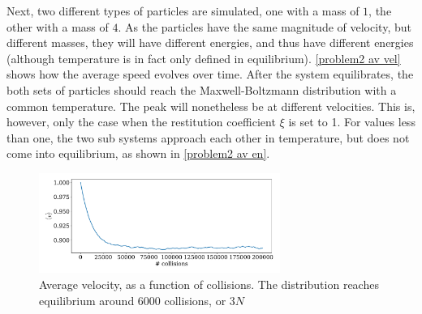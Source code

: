\documentclass{article}
\begin{document}
    Next, two different types of particles are simulated, one with a mass of $1$, the other with a mass of $4$.
    As the particles have the same magnitude of velocity, but different masses, they will have different energies, and thus have different energies (although temperature is in fact only defined in equilibrium).
    \autoref{problem2 av vel} shows how the average speed evolves over time.
    After the system equilibrates, the both sets of particles should reach the Maxwell-Boltzmann distribution with a common temperature.
    The peak will nonetheless be at different velocities.
    This is, however, only the case when the restitution coefficient $\xi$ is set to 1.
    For values less than one, the two sub systems approach each other in temperature, but does not come into equilibrium, as shown in \autoref{problem2 av en}.

    \begin{figure}[H]
        \centering
        \includegraphics[width=0.7\textwidth]{../plots/problem1/v_av.pdf}
        \caption{Average velocity, as a function of collisions.
        The distribution reaches equilibrium around $6000$ collisions, or $3N$}
        \label{problem1 av vel}
    \end{figure}
    
\end{document}
